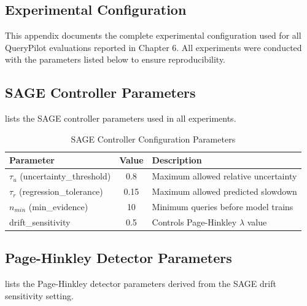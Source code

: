 
\begin{appendices}

\chapter{Experimental Configuration}
\label{app:config}

This appendix documents the complete experimental configuration used for all
QueryPilot evaluations reported in Chapter 6. All experiments were conducted
with the parameters listed below to ensure reproducibility.

\section*{SAGE Controller Parameters}

 lists the SAGE controller parameters used in all
experiments.

\begin{table}[htbp]
  \centering
  \caption{SAGE Controller Configuration Parameters}
  \label{tab:sage_params}
  \renewcommand{\arraystretch}{1.3}
  \begin{tabular}{|l|c|l|}
    \hline
    \textbf{Parameter} & \textbf{Value} & \textbf{Description} \\
    \hline
    $\tau_u$ (uncertainty\_threshold) & 0.8   & Maximum allowed relative uncertainty \\
    $\tau_r$ (regression\_tolerance)  & 0.15  & Maximum allowed predicted slowdown \\
    $n_{min}$ (min\_evidence)         & 10    & Minimum queries before model trains \\
    drift\_sensitivity                & 0.5   & Controls Page-Hinkley $\lambda$ value \\
    \hline
  \end{tabular}
\end{table}

\section*{Page-Hinkley Detector Parameters}

 lists the Page-Hinkley detector parameters derived
from the SAGE drift sensitivity setting.


\end{appendices}
